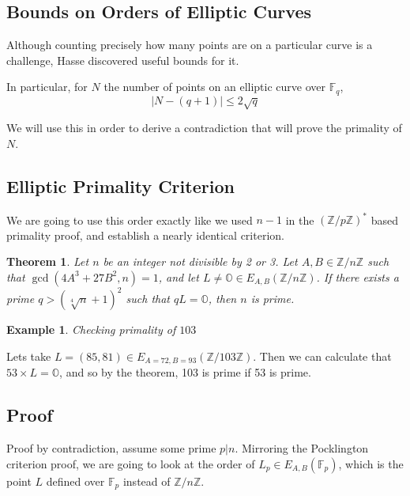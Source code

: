 \documentclass[]{article}
\newtheorem{theorem}{Theorem}
\newtheorem{benexample}{Example}
\newcommand{\Z}{\mathbb{Z}}
\newcommand{\OS}{\mathbb{O}}
\newcommand{\ZMZ}[1]{\Z/#1\Z}
\newcommand{\F}{\mathbb{F}}
\begin{document}
\subsection{Bounds on Orders of Elliptic Curves}

Although counting precisely how many points are on a particular curve is a challenge, Hasse discovered useful bounds for it.

In particular, for $N$ the number of points on an elliptic curve over $\F_q$,
$$|N-(q+1)| \le 2\sqrt{q}$$

We will use this in order to derive a contradiction that will prove the primality of $N$.

\subsection{Elliptic Primality Criterion}

We are going to use this order exactly like we used $n-1$ in the $(\ZMZ{p})^*$ based primality proof, and establish a nearly identical criterion.

\noindent \begin{theorem} Let $n$ be an integer not divisible by 2 or 3. Let $A,B \in \ZMZ{n}$ such that $\gcd(4A^3+27B^2,n) = 1$, and let $L \ne \OS \in E_{A,B}(\ZMZ{n})$. If there exists a prime $q > (\sqrt[4]{n}+1)^2$ such that $qL = \OS$, then $n$ is prime.
\end{theorem}

\begin{mdframed}[linewidth=2pt]
	\noindent \begin{benexample}
		Checking primality of $103$
	\end{benexample}

	Lets take $L = (85,81) \in E_{A=72,B=93}(\ZMZ{103})$. Then we can calculate that $53\times L = \OS$, and so by the theorem, 103 is prime if 53 is prime.

\end{mdframed}

\subsection{Proof}

Proof by contradiction, assume some prime $p | n$. Mirroring the Pocklington criterion proof, we are going to look at the order of $L_p \in E_{A,B}(\F_p)$, which is the point $L$ defined over $\F_p$ instead of $\ZMZ{n}$.
\end{document}
